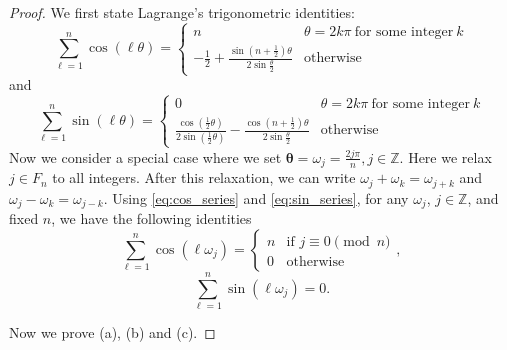 \begin{lem}
\begin{proof}
We first state Lagrange's trigonometric identities: 
\begin{equation}
\label{eq:cos_series}
\sum_{\ell=1}^n \cos(\ell\theta) = 
\begin{cases}
n & \theta = 2k\pi ~\text{for some integer}~ k \\
-\frac{1}{2}+\frac{\sin\left(n+\frac{1}{2}\right)\theta}{2\sin \frac{\theta}{2}}  & \text{otherwise}
\end{cases}
\end{equation}
and 
\begin{equation}
\label{eq:sin_series}
\sum_{\ell=1}^n \sin(\ell\theta) =
\begin{cases}
0 & \theta = 2k\pi ~\text{for some integer}~ k \\ 
\frac{\cos (\frac{1}{2}\theta)}{2\sin (\frac{1}{2}\theta)}-\frac{\cos\left(n+\frac{1}{2}\right)\theta}{2\sin \frac{\theta}{2}} & \text{otherwise}
\end{cases}
\end{equation}
Now we consider a special case where we set $\mathbf{\theta} = \omega_j = \frac{2j\pi}{n}, j\in \mathbb{Z}$. Here we relax $j\in F_n$ to all integers. After this relaxation, we can write $\omega_j+\omega_k = \omega_{j+k}$ and $\omega_j-\omega_k = \omega_{j-k}$. Using \eqref{eq:cos_series} and \eqref{eq:sin_series}, 
for any $\omega_j$, $ j \in \mathbb{Z}$, and fixed $n$, we have the following identities
\begin{equation}
\label{eq:omega_cos}
\sum_{\ell=1}^n \cos(\ell\omega_j) = 
\begin{cases}
n &  \mbox{if } j \equiv 0\pmod{n} \\
0  & \text{otherwise}
\end{cases},
\end{equation}
\begin{equation}
\label{eq:omega_sin}
\sum_{\ell=1}^n \sin(\ell\omega_j) = 0.
\end{equation}\par
Now we prove (a), (b) and (c).


\end{proof}
\end{lem}
